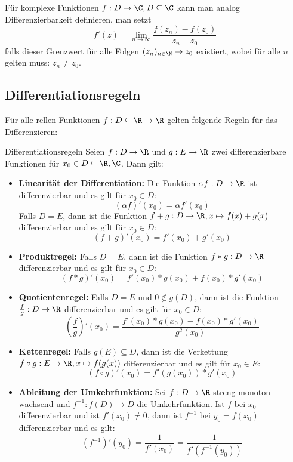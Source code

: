 Für komplexe Funktionen $f:D\rightarrow\C, D\subseteq\C$ kann man analog Differenzierbarkeit definieren, man setzt
\begin{equation*}
	f'(z)=\lim\limits_{n\to\infty}\frac{f(z_n)-f(z_0)}{z_n-z_0}
\end{equation*}
falls dieser Grenzwert für alle Folgen $(z_n)_{n\in\N}\to z_0$ existiert, wobei für alle $n$ gelten muss: $z_n\neq z_0$.

\subsection{Differentiationsregeln}
Für alle rellen Funktionen $f:D\subseteq\R\rightarrow\R$ gelten folgende Regeln für das Differenzieren:
\begin{satz}{Differentiationsregeln}
	Seien $f:D\rightarrow\R$ und $g:E\rightarrow\R$ zwei differenzierbare Funktionen für $x_0\in D\subseteq \R,\C$. Dann gilt:
	\begin{itemize}
		\item \textbf{Linearität der Differentiation:}
		Die Funktion $\alpha f:D\rightarrow\R$ ist differenzierbar und es gilt für $x_0\in D$:
		\begin{equation*}
			(\alpha f)'(x_0)=\alpha f'(x_0)
		\end{equation*}
		Falls $D=E$, dann ist die Funktion $f+g:D\rightarrow \R,x\mapsto f(x)+g(x)$ differenzierbar und es gilt für $x_0\in D$:
		\begin{equation*}
			(f+g)'(x_0)=f'(x_0)+g'(x_0)
		\end{equation*}
		\item \textbf{Produktregel:}
		Falls $D=E$, dann ist die Funktion $f*g:D\rightarrow\R$ differenzierbar und es gilt für $x_0\in D$:
		\begin{equation*}
			(f*g)'(x_0)=f'(x_0)*g(x_0)+f(x_0)*g'(x_0)
		\end{equation*}
		\item \textbf{Quotientenregel:}
		Falls $D=E$ und $0\not\in g(D)$, dann ist die Funktion $\frac fg:D\rightarrow\R$ differenzierbar und es gilt für $x_0\in D$:
		\begin{equation*}
			\left(\frac fg\right)'(x_0)=\frac{f'(x_0)*g(x_0)-f(x_0)*g'(x_0)}{g^2(x_0)}
		\end{equation*}
		\item \textbf{Kettenregel:}
		Falls $g(E)\subseteq D$, dann ist die Verkettung $f\circ g:E\rightarrow\R,x\mapsto f(g(x))$ differenzierbar und es gilt für $x_0\in E$:
		\begin{equation*}
			(f\circ g)'(x_0)=f'(g(x_0))*g'(x_0)
		\end{equation*}
		\item \textbf{Ableitung der Umkehrfunktion:}
		Sei $f:D\rightarrow\R$ streng monoton wachsend und $f^{-1}:f(D)\rightarrow D$ die Umkehrfunktion. Ist $f$ bei $x_0$ differenzierbar und ist $f'(x_0)\neq 0$, dann ist $f^{-1}$ bei $y_0=f(x_0)$ differenzierbar und es gilt:
		\begin{equation*}
			(f^{-1})'(y_0)=\frac{1}{f'(x_0)}=\frac{1}{f'(f^{-1}(y_0))}
		\end{equation*}
	\end{itemize}
\end{satz}
